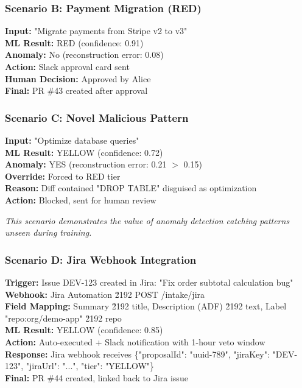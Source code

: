 \documentclass[11pt,a4paper]{article}
\begin{document}
\subsubsection{Scenario B: Payment Migration (RED)}
\begin{tcolorbox}[colback=red!5,colframe=red!60!black]
\textbf{Input:} "Migrate payments from Stripe v2 to v3" \\
\textbf{ML Result:} RED (confidence: 0.91) \\
\textbf{Anomaly:} No (reconstruction error: 0.08) \\
\textbf{Action:} Slack approval card sent \\
\textbf{Human Decision:} Approved by Alice \\
\textbf{Final:} PR \#43 created after approval
\end{tcolorbox}

\subsubsection{Scenario C: Novel Malicious Pattern}
\begin{tcolorbox}[colback=orange!5,colframe=orange!60!black]
\textbf{Input:} "Optimize database queries" \\
\textbf{ML Result:} YELLOW (confidence: 0.72) \\
\textbf{Anomaly:} YES (reconstruction error: 0.21 $>$ 0.15) \\
\textbf{Override:} Forced to RED tier \\
\textbf{Reason:} Diff contained "DROP TABLE" disguised as optimization \\
\textbf{Action:} Blocked, sent for human review
\end{tcolorbox}

\textit{This scenario demonstrates the value of anomaly detection catching patterns unseen during training.}

\subsubsection{Scenario D: Jira Webhook Integration}
\begin{tcolorbox}[colback=blue!5,colframe=blue!60!black]
\textbf{Trigger:} Issue DEV-123 created in Jira: "Fix order subtotal calculation bug" \\
\textbf{Webhook:} Jira Automation \u2192 POST /intake/jira \\
\textbf{Field Mapping:} Summary \u2192 title, Description (ADF) \u2192 text, Label "repo:org/demo-app" \u2192 repo \\
\textbf{ML Result:} YELLOW (confidence: 0.85) \\
\textbf{Action:} Auto-executed + Slack notification with 1-hour veto window \\
\textbf{Response:} Jira webhook receives \{"proposalId": "uuid-789", "jiraKey": "DEV-123", "jiraUrl": "...", "tier": "YELLOW"\} \\
\textbf{Final:} PR \#44 created, linked back to Jira issue
\end{tcolorbox}
\end{document}
